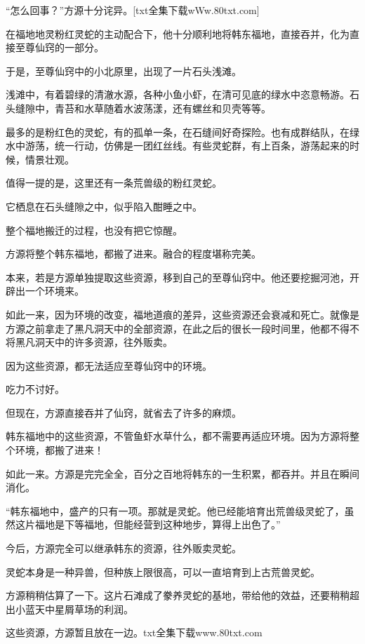 
\begin{this_body}

“怎么回事？”方源十分诧异。[txt全集下载wWw.80txt.com]

在福地地灵粉红灵蛇的主动配合下，他十分顺利地将韩东福地，直接吞并，化为直接至尊仙窍的一部分。

于是，至尊仙窍中的小北原里，出现了一片石头浅滩。

浅滩中，有着碧绿的清澈水源，各种小鱼小虾，在清可见底的绿水中恣意畅游。石头缝隙中，青苔和水草随着水波荡漾，还有螺丝和贝壳等等。

最多的是粉红色的灵蛇，有的孤单一条，在石缝间好奇探险。也有成群结队，在绿水中游荡，统一行动，仿佛是一团红丝线。有些灵蛇群，有上百条，游荡起来的时候，情景壮观。

值得一提的是，这里还有一条荒兽级的粉红灵蛇。

它栖息在石头缝隙之中，似乎陷入酣睡之中。

整个福地搬迁的过程，也没有把它惊醒。

方源将整个韩东福地，都搬了进来。融合的程度堪称完美。

本来，若是方源单独提取这些资源，移到自己的至尊仙窍中。他还要挖掘河池，开辟出一个环境来。

如此一来，因为环境的改变，福地道痕的差异，这些资源还会衰减和死亡。就像是方源之前拿走了黑凡洞天中的全部资源，在此之后的很长一段时间里，他都不得不将黑凡洞天中的许多资源，往外贩卖。

因为这些资源，都无法适应至尊仙窍中的环境。

吃力不讨好。

但现在，方源直接吞并了仙窍，就省去了许多的麻烦。

韩东福地中的这些资源，不管鱼虾水草什么，都不需要再适应环境。因为方源将整个环境，都搬了进来！

如此一来。方源是完完全全，百分之百地将韩东的一生积累，都吞并。并且在瞬间消化。

“韩东福地中，盛产的只有一项。那就是灵蛇。他已经能培育出荒兽级灵蛇了，虽然这片福地是下等福地，但能经营到这种地步，算得上出色了。”

今后，方源完全可以继承韩东的资源，往外贩卖灵蛇。

灵蛇本身是一种异兽，但种族上限很高，可以一直培育到上古荒兽灵蛇。

方源稍稍估算了一下。这片石滩成了豢养灵蛇的基地，带给他的效益，还要稍稍超出小蓝天中星屑草场的利润。

这些资源，方源暂且放在一边。txt全集下载www.80txt.com


\end{this_body}
